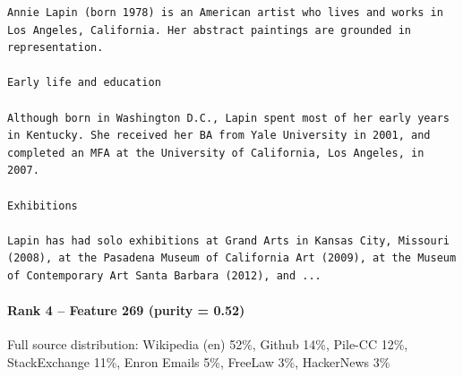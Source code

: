 \begin{verbatim}
Annie Lapin (born 1978) is an American artist who lives and works in Los Angeles, California. Her abstract paintings are grounded in representation.

Early life and education 

Although born in Washington D.C., Lapin spent most of her early years in Kentucky. She received her BA from Yale University in 2001, and completed an MFA at the University of California, Los Angeles, in 2007.

Exhibitions 

Lapin has had solo exhibitions at Grand Arts in Kansas City, Missouri (2008), at the Pasadena Museum of California Art (2009), at the Museum of Contemporary Art Santa Barbara (2012), and ...

\end{verbatim}

\paragraph*{Rank 4 -- Feature 269 (purity = 0.52)}

Full source distribution: Wikipedia (en) 52\%, Github 14\%, Pile-CC 12\%, StackExchange 11\%, Enron Emails 5\%, FreeLaw 3\%, HackerNews 3\%

